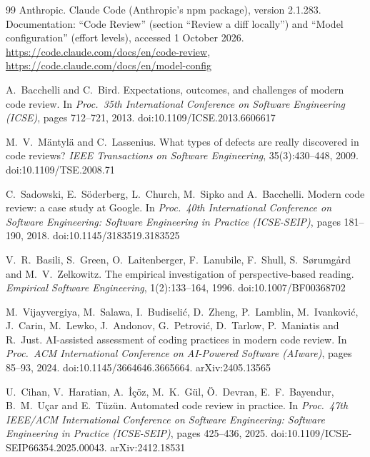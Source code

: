 \documentclass[11pt,a4paper]{article}
\begin{document}
\begin{thebibliography}{99}
Anthropic.
\newblock Claude Code (Anthropic's npm package), version
2.1.283. Documentation: ``Code Review'' (section ``Review a diff
locally'') and ``Model configuration'' (effort levels), accessed
1 October 2026.
\newblock \url{https://code.claude.com/docs/en/code-review},
\url{https://code.claude.com/docs/en/model-config}

A.~Bacchelli and C.~Bird.
\newblock Expectations, outcomes, and challenges of modern code review.
\newblock In \emph{Proc.\ 35th International Conference on Software
Engineering (ICSE)}, pages 712--721, 2013.
\newblock doi:10.1109/ICSE.2013.6606617

M.~V.~M\"antyl\"a and C.~Lassenius.
\newblock What types of defects are really discovered in code reviews?
\newblock \emph{IEEE Transactions on Software Engineering},
35(3):430--448, 2009.
\newblock doi:10.1109/TSE.2008.71

C.~Sadowski, E.~S\"oderberg, L.~Church, M.~Sipko and A.~Bacchelli.
\newblock Modern code review: a case study at Google.
\newblock In \emph{Proc.\ 40th International Conference on Software
Engineering: Software Engineering in Practice (ICSE-SEIP)}, pages
181--190, 2018.
\newblock doi:10.1145/3183519.3183525

V.~R.~Basili, S.~Green, O.~Laitenberger, F.~Lanubile, F.~Shull,
S.~S{\o}rumg{\aa}rd and M.~V.~Zelkowitz.
\newblock The empirical investigation of perspective-based reading.
\newblock \emph{Empirical Software Engineering}, 1(2):133--164, 1996.
\newblock doi:10.1007/BF00368702

M.~Vijayvergiya, M.~Salawa, I.~Budiseli\'c, D.~Zheng, P.~Lamblin,
M.~Ivankovi\'c, J.~Carin, M.~Lewko, J.~Andonov, G.~Petrovi\'c, D.~Tarlow,
P.~Maniatis and R.~Just.
\newblock AI-assisted assessment of coding practices in modern code review.
\newblock In \emph{Proc.\ ACM International Conference on AI-Powered
Software (AIware)}, pages 85--93, 2024.
\newblock doi:10.1145/3664646.3665664. arXiv:2405.13565

U.~Cihan, V.~Haratian, A.~\.I\c{c}\"oz, M.~K.~G\"ul, \"O.~Devran,
E.~F.~Bayendur, B.~M.~U\c{c}ar and E.~T\"uz\"un.
\newblock Automated code review in practice.
\newblock In \emph{Proc.\ 47th IEEE/ACM International Conference on
Software Engineering: Software Engineering in Practice (ICSE-SEIP)},
pages 425--436, 2025.
\newblock doi:10.1109/ICSE-SEIP66354.2025.00043. arXiv:2412.18531


\end{thebibliography}
\end{document}
